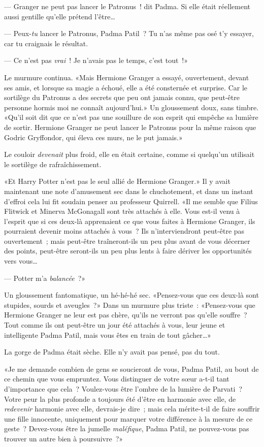 --- Granger ne peut pas lancer le Patronus~! dit Padma. Si elle était réellement aussi gentille qu'elle prétend l'être…

--- Peux-\emph{tu} lancer le Patronus, Padma Patil~? Tu n'as même pas osé t'y essayer, car tu craignais le résultat.

--- Ce n'est pas \emph{vrai}~! Je n'avais pas le temps, c'est tout~!»

Le murmure continua. «Mais Hermione Granger a essayé, ouvertement, devant ses amis, et lorsque sa magie a échoué, elle a été consternée et surprise. Car le sortilège du Patronus a des secrets que peu ont jamais connu, que peut-être personne hormis moi ne connaît aujourd'hui.» Un gloussement doux, sans timbre. «Qu'il soit dit que ce n'est pas une souillure de son esprit qui empêche sa lumière de sortir. Hermione Granger ne peut lancer le Patronus pour la même raison que Godric Gryffondor, qui éleva ces murs, ne le put jamais.»

Le couloir \emph{devenait} plus froid, elle en était certaine, comme si quelqu'un utilisait le sortilège de rafraîchissement.

«Et Harry Potter n'est pas le seul allié de Hermione Granger.» Il y avait maintenant une note d'amusement sec dans le chuchotement, et dans un instant d'effroi cela lui fit soudain penser au professeur Quirrell. «Il me semble que Filius Flitwick et Minerva McGonagall sont très attachés à elle. Vous est-il venu à l'esprit que si ces deux-là apprenaient ce que vous faites à Hermione Granger, ils pourraient devenir moins attachés à vous~? Ils n'interviendront peut-être pas ouvertement~; mais peut-être traîneront-ils un peu plus avant de vous décerner des points, peut-être seront-ils un peu plus lents à faire dériver les opportunités vers vous…

--- Potter m'a \emph{balancée}~?»

Un gloussement fantomatique, un hé-hé-hé sec. «Pensez-vous que ces deux-là sont stupides, sourds et aveugles~?» Dans un murmure plus triste~: «Pensez-vous que Hermione Granger ne leur est pas chère, qu'ils ne verront pas qu'elle souffre~? Tout comme ils ont peut-être un jour été attachés à vous, leur jeune et intelligente Padma Patil, mais vous êtes en train de tout gâcher…»

La gorge de Padma était sèche. Elle n'y avait pas pensé, pas du tout.

«Je me demande combien de gens se soucieront de vous, Padma Patil, au bout de ce chemin que vous empruntez. Vous distinguer de votre sœur a-t-il tant d'importance que cela~? Voulez-vous être l'ombre de la lumière de Parvati~? Votre peur la plus profonde a toujours été d'être en harmonie avec elle, de \emph{redevenir} harmonie avec elle, devrais-je dire~; mais cela mérite-t-il de faire souffrir une fille innocente, uniquement pour marquer votre différence à la mesure de ce geste~? Devez-vous être la jumelle \emph{maléfique}, Padma Patil, ne pouvez-vous pas trouver un autre bien à poursuivre~?»

